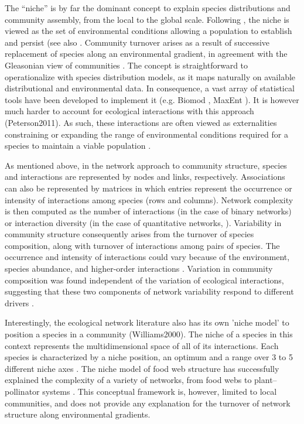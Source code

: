 \documentclass[12pt]{article}
\begin{document}
The “niche” is by far the dominant concept to explain species distributions
and community assembly, from the local to the global scale. Following
\citealt{Hutchinson1957}, the niche is viewed as the set of environmental
conditions allowing a population to establish and persist (see also
\citealt{Holt2009}. Community turnover arises as a result of successive
replacement of species along an environmental gradient, in agreement with the
Gleasonian view of communities \citep{Gleason1926}. The concept is
straightforward to operationalize with species distribution models, as it maps
naturally on available distributional and environmental data. In consequence,
a vast array of statistical tools have been developed to implement it (e.g.
Biomod \citealt{Thuiller2003}, MaxEnt \citealt{Phillips2006}). It is however
much harder to account for ecological interactions with this approach
(Peterson2011). As such, these interactions are often viewed as externalities
constraining or expanding the range of environmental conditions required for a
species to maintain a viable population \citep{Pulliam2000, Soberon2007}.

As mentioned above, in the network approach to community structure, species
and interactions are represented by nodes and links, respectively.
Associations can also be represented by matrices in which entries represent
the occurrence or intensity of interactions among species (rows and columns).
Network complexity is then computed as the number of interactions (in the case
of binary networks) or interaction diversity (in the case of quantitative
networks, \citealt{Bersier2002}). Variability in community structure
consequently arises from the turnover of species composition, along with
turnover of interactions among pairs of species. The occurrence and intensity
of interactions could vary because of the environment, species abundance, and
higher-order interactions \citep{Poisot2015a}. Variation in community
composition was found independent of the variation of ecological interactions,
suggesting that these two components of network variability respond to
different drivers \citep{Poisot2012}.

Interestingly, the ecological network literature also has its own ’niche
model’ to position a species in a community (Williams2000). The niche of a
species in this context represents the multidimensional space of all of its
interactions. Each species is characterized by a niche position, an optimum
and a range over 3 to 5 different niche axes \citep{Williams2000, Eklof2013}.
The niche model of food web structure has successfully explained the
complexity of a variety of networks, from food webs to plant–pollinator
systems \citep{Allesina2008, Williams2010, Eklof2013}. This
conceptual framework is, however, limited to local communities, and does not
provide any explanation for the turnover of network structure along
environmental gradients.
\end{document}

